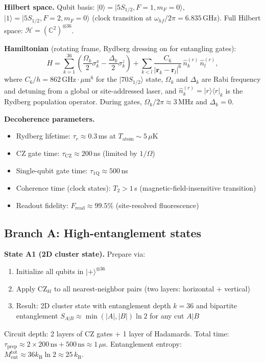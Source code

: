 \documentclass[12pt,letterpaper]{article}
\theoremstyle{plain}
\theoremstyle{definition}
\theoremstyle{remark}
\newcommand{\kB}{k_{\mathrm{B}}}
\newcommand{\Ment}{M_{\mathrm{ent}}}
\begin{document}
\textbf{Hilbert space.}
Qubit basis: $|0\rangle = |5S_{1/2}, F=1, m_F=0\rangle$,
$|1\rangle = |5S_{1/2}, F=2, m_F=0\rangle$ (clock transition at $\omega_{hf}/2\pi = 6.835$\,GHz).
Full Hilbert space: $\mathcal{H} = (\mathbb{C}^2)^{\otimes 36}$.

\textbf{Hamiltonian} (rotating frame, Rydberg dressing on for entangling gates):
\begin{equation}
  H
  = \sum_{k=1}^{36}\!\left(
      \frac{\Omega_k}{2}\sigma^x_k - \frac{\Delta_k}{2}\sigma^z_k
    \right)
  + \sum_{k < l}\!\frac{C_6}{|\mathbf{r}_k - \mathbf{r}_l|^6}\,
    \hat{n}^{(r)}_k\,\hat{n}^{(r)}_l,
  \label{eq:H-rydberg}
\end{equation}
where $C_6/h = 862\,\text{GHz}\cdot\mu\text{m}^6$ for the $|70S_{1/2}\rangle$ state,
$\Omega_k$ and $\Delta_k$ are Rabi frequency and detuning from a global or site-addressed
laser, and $\hat{n}^{(r)}_k = |r\rangle\langle r|_k$ is the Rydberg population operator.
During gates, $\Omega_k/2\pi \approx 3$\,MHz and $\Delta_k = 0$.

\textbf{Decoherence parameters.}
\begin{itemize}
  \item Rydberg lifetime: $\tau_r \approx 0.3$\,ms at $T_{\mathrm{atom}} \sim 5\,\mu$K
  \item CZ gate time: $\tau_{\mathrm{CZ}} \approx 200$\,ns (limited by $1/\Omega$)
  \item Single-qubit gate time: $\tau_{\mathrm{1Q}} \approx 500$\,ns
  \item Coherence time (clock states): $T_2 > 1$\,s (magnetic-field-insensitive transition)
  \item Readout fidelity: $F_{\mathrm{read}} \approx 99.5\%$ (site-resolved fluorescence)
\end{itemize}

\subsection{Branch A: High-entanglement states}

\textbf{State A1 (2D cluster state).}  Prepare via:
\begin{enumerate}
  \item Initialize all qubits in $|+\rangle^{\otimes 36}$
  \item Apply CZ$_{kl}$ to all nearest-neighbor pairs (two layers: horizontal + vertical)
  \item Result: 2D cluster state with entanglement depth $k = 36$ and
    bipartite entanglement $S_{A|B} \approx \min(|A|, |B|)\ln 2$ for any cut $A|B$
\end{enumerate}
Circuit depth: 2 layers of CZ gates + 1 layer of Hadamards.
Total time: $\tau_{\mathrm{prep}} \approx 2 \times 200\,\text{ns} + 500\,\text{ns} \approx 1\,\mu$s.
Entanglement entropy: $\Ment^{\mathrm{tot}} \approx 36\kB\ln 2 \approx 25\,\kB$.
\end{document}
